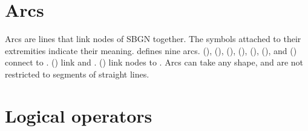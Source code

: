 \section{Arcs}\label{sec:arcs}
 
Arcs are lines that link nodes of SBGN together. The symbols attached to their extremities indicate their meaning. \SBGNPDLone defines nine arcs.  (),  (),  (),  (),  (),  (), and  () connect  to .  () link  and .   () link nodes to . Arcs can take any shape, and are not restricted to segments of straight lines. 










 
 
\section{Logical operators}\label{sec:logic}
 





% 
%
%
% 
% 
% 

